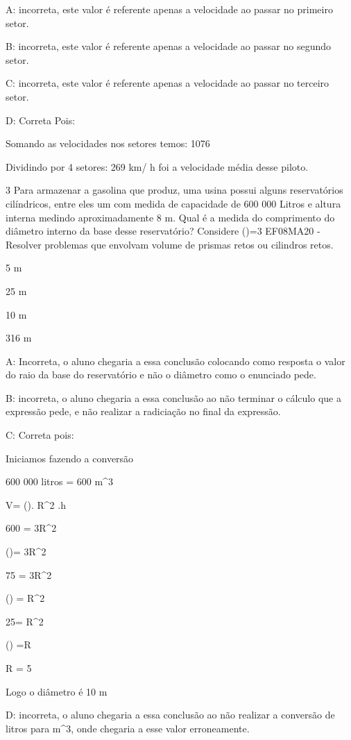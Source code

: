 A: incorreta, este valor é referente apenas a velocidade ao passar no
primeiro setor.

B: incorreta, este valor é referente apenas a velocidade ao passar no
segundo setor.

C: incorreta, este valor é referente apenas a velocidade ao passar no
terceiro setor.

D: Correta Pois:

Somando as velocidades nos setores temos: 1076

Dividindo por 4 setores: 269 km/ h foi a velocidade média desse piloto.

\num{3} Para armazenar a gasolina que produz, uma usina possui alguns
reservatórios cilíndricos, entre eles um com medida de capacidade de 600
000 Litros e altura interna medindo aproximadamente 8 m. Qual é a medida
do comprimento do diâmetro interno da base desse reservatório? Considere
(\Pi)=3 EF08MA20 - Resolver problemas que envolvam volume de prismas
retos ou cilindros retos.

\item 5 m
\item 25 m
\item 10 m
\item 316 m

A: Incorreta, o aluno chegaria a essa conclusão colocando como resposta
o valor do raio da base do reservatório e não o diâmetro como o
enunciado pede.

B: incorreta, o aluno chegaria a essa conclusão ao não terminar o
cálculo que a expressão pede, e não realizar a radiciação no final da
expressão.

C: Correta pois:

Iniciamos fazendo a conversão

600 000 litros = 600 m^3

V= (\Pi). R^2 .h

600 = 3\times R^2

()= 3\times R^2

75 = 3\times R^2

() = R^2

25= R^2

() =R

R = 5

Logo o diâmetro é 10 m

D: incorreta, o aluno chegaria a essa conclusão ao não realizar a
conversão de litros para m^3, onde chegaria a esse valor erroneamente.

